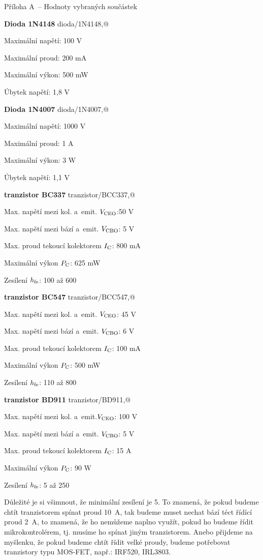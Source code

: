 \nonum \sec Příloha A~-- Hodnoty vybraných součástek

{\bf Dioda 1N4148}  \dest[ref:1N4148] \ii dioda/1N4148,@ 

Maximální napětí: 100 V

Maximální proud: 200 mA

Maximální výkon:  500 mW

Úbytek napětí: 1,8 V

\vskip 2mm

{\bf Dioda 1N4007} \dest[ref:1N4007] \ii dioda/1N4007,@ 

Maximální napětí: 1000 V

Maximální proud: 1 A

Maximální výkon: 3 W

Úbytek napětí: 1,1 V

\vskip 2mm

{\bf tranzistor BC337}  \ii tranzistor/BCC337,@

Max. napětí mezi kol. a~emit. $V \rm _{CEO}$:50 V

Max. napětí mezi bází a~emit. $V \rm _{CBO}$: 5 V

Max. proud tekoucí kolektorem $I \rm _C$: 800 mA

Maximální výkon $ P \rm _C$: 625 mW

Zesílení $ h \rm _{fe}$: 100 až 600

\vskip 2mm

{\bf tranzistor BC547}  \ii tranzistor/BCC547,@

Max. napětí mezi kol. a~emit. $ V \rm_{CEO}$: 45 V

Max. napětí mezi bází a~emit. $ V \rm _{CBO}$: 6 V
 
Max. proud tekoucí kolektorem $ I \rm _C$: 100 mA

Maximální výkon $P \rm _C$: 500 mW

Zesílení $h \rm _{fe}$: 110 až 800

\vskip 2mm

{\bf tranzistor BD911}  \dest[ref:BD911] \ii tranzistor/BD911,@

Max. napětí mezi kol. a~emit.$V \rm _{CEO}$: 100 V

Max. napětí mezi bází a~emit. $V \rm _{CBO}$: 5 V

Max. proud tekoucí kolektorem $I \rm _C$: 15 A

Maximální výkon $P \rm _C$: 90 W

Zesílení $h \rm _{fe}$: 5 až 250

Důležité je si všimnout, že minimální zesílení je 5. To znamená, že pokud budeme chtít tranzistorem spínat proud 10~A, tak budeme muset nechat bází téct řídící proud 2~A, to znamená, že ho nemůžeme naplno využít, pokud ho budeme řídit mikrokontrolérem, tj. musíme ho spínat jiným tranzistorem. Anebo přijdeme na myšlenku, že pokud budeme chtít řídit velké proudy, budeme potřebovat tranzistory typu MOS-FET, např.: IRF520, IRL3803.

